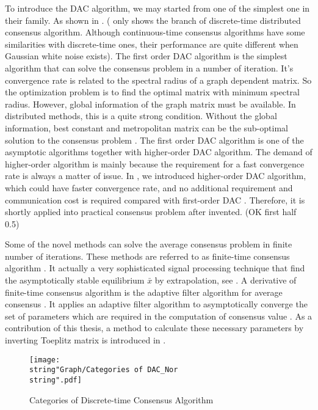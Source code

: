 To introduce the DAC algorithm, we may started from one of the simplest
one in their family. As shown in .
( only shows the branch
of discrete-time distributed consensus algorithm. Although continuous-time
consensus algorithms have some similarities with discrete-time ones,
their performance are quite different when Gaussian white noise exists).
The first order DAC algorithm is the simplest algorithm that can solve
the consensus problem in a number of iteration. It's convergence rate
is related to the spectral radius of a graph dependent matrix. So
the optimization problem is to find the optimal matrix with minimum
spectral radius. However, global information of the graph matrix must
be available. In distributed methods, this is a quite strong condition.
Without the global information, best constant and metropolitan matrix
can be the sub-optimal solution to the consensus problem \cite{Xiao2004}.
The first order DAC algorithm is one of the asymptotic algorithms
together with higher-order DAC algorithm. The demand of higher-order
algorithm is mainly because the requirement for a fast convergence
rate is always a matter of issue. In ,
we introduced higher-order DAC algorithm, which could have faster
convergence rate, and no additional requirement and communication
cost is required compared with first-order DAC \cite{Xiong2010}.
Therefore, it is shortly applied into practical consensus problem
after invented. (OK first half 0.5)

Some of the novel methods can solve the average consensus problem
in finite number of iterations. These methods are referred to as finite-time
consensus algorithm \cite{Sundaram2007}. It actually a very sophisticated
signal processing technique that find the asymptotically stable equilibrium
$\bar{x}$ by extrapolation, see .
A derivative of finite-time consensus algorithm is the adaptive filter
algorithm for average consensus . It applies an adaptive filter algorithm
to asymptotically converge the set of parameters which are required
in the computation of consensus value \cite{Cavalcante2010}. As a
contribution of this thesis, a method to calculate these necessary
parameters by inverting Toeplitz matrix is introduced in . 

\begin{figure}
\hfill{}\texttt{[image: \\string"Graph/Categories of DAC\_Nor\\string".pdf]}\hfill{}

\caption{\label{fig:Categories-of-Discrete-time}Categories of Discrete-time
Consensus Algorithm}
\end{figure}



\subsection*{}
